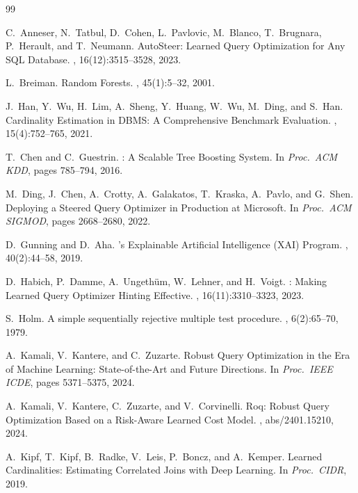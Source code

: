 \documentclass[sigconf,natbib=false]{article}
\begin{document}
\begin{thebibliography}{99}

C.~Anneser, N.~Tatbul, D.~Cohen, L.~Pavlovic, M.~Blanco, T.~Brugnara,
P.~Herault, and T.~Neumann.
\newblock AutoSteer: Learned Query Optimization for Any {SQL} Database.
, 16(12):3515--3528, 2023.

L.~Breiman.
\newblock Random Forests.
, 45(1):5--32, 2001.

J.~Han, Y.~Wu, H.~Lim, A.~Sheng, Y.~Huang, W.~Wu, M.~Ding, and S.~Han.
\newblock Cardinality Estimation in {DBMS}: A Comprehensive Benchmark Evaluation.
, 15(4):752--765, 2021.

T.~Chen and C.~Guestrin.
: A Scalable Tree Boosting System.
\newblock In {\em Proc.\ ACM KDD}, pages 785--794, 2016.

M.~Ding, J.~Chen, A.~Crotty, A.~Galakatos, T.~Kraska, A.~Pavlo, and G.~Shen.
\newblock Deploying a Steered Query Optimizer in Production at {Microsoft}.
\newblock In {\em Proc.\ ACM SIGMOD}, pages 2668--2680, 2022.

D.~Gunning and D.~Aha.
's Explainable Artificial Intelligence ({XAI}) Program.
, 40(2):44--58, 2019.

D.~Habich, P.~Damme, A.~Ungeth\"{u}m, W.~Lehner, and H.~Voigt.
: Making Learned Query Optimizer Hinting Effective.
, 16(11):3310--3323, 2023.

S.~Holm.
\newblock A simple sequentially rejective multiple test procedure.
, 6(2):65--70, 1979.

A.~Kamali, V.~Kantere, and C.~Zuzarte.
\newblock Robust Query Optimization in the Era of Machine Learning:
  State-of-the-Art and Future Directions.
\newblock In {\em Proc.\ IEEE ICDE}, pages 5371--5375, 2024.

A.~Kamali, V.~Kantere, C.~Zuzarte, and V.~Corvinelli.
\newblock Roq: Robust Query Optimization Based on a Risk-Aware Learned
  Cost Model.
, abs/2401.15210, 2024.

A.~Kipf, T.~Kipf, B.~Radke, V.~Leis, P.~Boncz, and A.~Kemper.
\newblock Learned Cardinalities: Estimating Correlated Joins with Deep Learning.
\newblock In {\em Proc.\ CIDR}, 2019.


\end{thebibliography}
\end{document}
